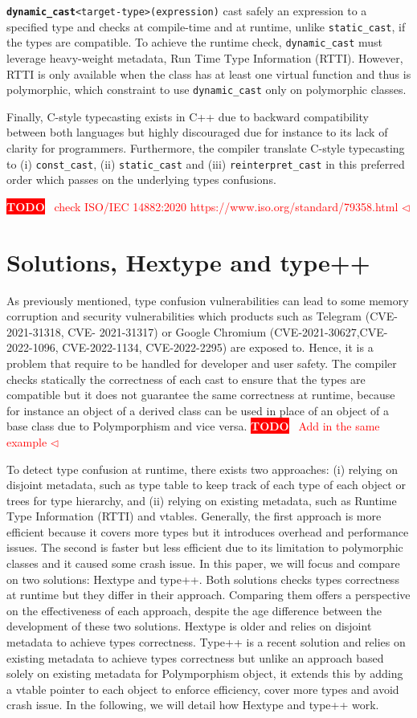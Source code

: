 \documentclass[a4paper,11pt,oneside]{report}
\newcommand{\todobox}[3]{%
       \colorbox{#1}{\textcolor{white}{\sffamily\bfseries\scriptsize #2}}%
       ~\textcolor{#1}{#3} %
       \textcolor{#1}{$\triangleleft$}%
}
\newcommand{\adrbqt}[1]{\todobox{red}{TODO}{#1}}
\begin{document}
\texttt{\textbf{dynamic\_cast}<target-type>(expression)} cast safely an expression to a specified type and checks at compile-time and at runtime, unlike \texttt{static\_cast}, if the types are compatible. 
To achieve the runtime check, \texttt{dynamic\_cast} must leverage heavy-weight metadata, Run Time Type Information (RTTI). However, RTTI is only available when the class has at least one virtual function 
and thus is polymorphic, which constraint to use \texttt{dynamic\_cast} only on polymorphic classes.

Finally, C-style typecasting exists in C++ due to backward compatibility between both languages but highly discouraged due for instance to its lack of clarity for programmers. 
Furthermore, the compiler translate C-style typecasting to (i) \texttt{const\_cast}, (ii) \texttt{static\_cast} and (iii) \texttt{reinterpret\_cast} in this preferred order which passes on the underlying types confusions.

\adrbqt{check ISO/IEC 14882:2020 https://www.iso.org/standard/79358.html}

\section{Solutions, Hextype and type++}

As previously mentioned, type confusion vulnerabilities can lead to some memory corruption and security vulnerabilities which products such as Telegram (CVE-2021-31318, CVE-
2021-31317) or Google Chromium (CVE-2021-30627,CVE-2022-1096, CVE-2022-1134, CVE-2022-2295) are exposed to. Hence, it is a problem that require to be handled for developer and user safety. 
The compiler checks statically the correctness of each cast to ensure that the types are compatible but it does not guarantee the same correctness at runtime, 
because for instance an object of a derived class can be used in place of an object of a base class due to Polymporphism and vice versa. \adrbqt{Add in the same example} 
To detect type confusion at runtime, there exists two approaches: (i) relying on disjoint metadata, such as type table to keep track of each type of each object or trees for type hierarchy, and 
(ii) relying on existing metadata, such as Runtime Type Information (RTTI) and vtables. 
Generally, the first approach is more efficient because it covers more types but it introduces overhead and performance issues. The second is faster but less efficient due to its limitation to polymorphic classes and it caused some crash issue. 
In this paper, we will focus and compare on two solutions: Hextype and type++. 
Both solutions checks types correctness at runtime but they differ in their approach. Comparing them offers a perspective on the effectiveness of each approach, despite the age difference between the development of these two solutions.
Hextype is older and relies on disjoint metadata to achieve types correctness. 
Type++ is a recent solution and relies on existing metadata to achieve types correctness but unlike an approach based solely on existing metadata for Polymporphism object,
it extends this by adding a vtable pointer to each object to enforce efficiency, cover more types and avoid crash issue. In the following, we will detail how Hextype and type++ work.
\end{document}
